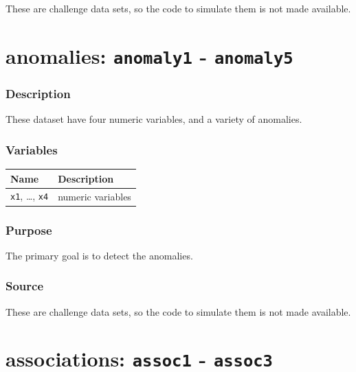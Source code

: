 \documentclass[
  letterpaper,
]{krantz}
\newcounter{none} %
\begin{document}
These are challenge data sets, so the code to simulate them is not made
available.

\section{\texorpdfstring{anomalies: \texttt{anomaly1} -
\texttt{anomaly5}}{anomalies: anomaly1 - anomaly5}}\label{anomalies-anomaly1---anomaly5}

\subsubsection*{Description}\label{description-11}

These dataset have four numeric variables, and a variety of anomalies.

\subsubsection*{Variables}\label{variables-11}

{\def\LTcaptype{none} %
\begin{longtable}[]{@{}ll@{}}
\toprule\noalign{}
Name & Description \\
\midrule\noalign{}
\endhead
\bottomrule\noalign{}
\endlastfoot
\texttt{x1}, \ldots, \texttt{x4} & numeric variables \\
\end{longtable}
}

\subsubsection*{Purpose}\label{purpose-11}

The primary goal is to detect the anomalies.

\subsubsection*{Source}\label{source-11}

These are challenge data sets, so the code to simulate them is not made
available.

\section{\texorpdfstring{associations: \texttt{assoc1} -
\texttt{assoc3}}{associations: assoc1 - assoc3}}\label{associations-assoc1---assoc3}
\end{document}
